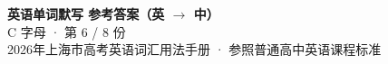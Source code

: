 \documentclass[10pt,a4paper]{article}
\begin{document}
\pagestyle{plain}

\begin{center}
{\LARGE\bfseries 英语单词默写 \quad 参考答案（英 $\to$ 中）}\\[0.22em]
{\large C 字母 · 第 6 / 8 份}\\[0.18em]
{\small 2026年上海市高考英语词汇用法手册 · 参照普通高中英语课程标准}
\end{center}

\vspace{0.2em}
\noindent{\color{rulegray}\rule{\textwidth}{0.8pt}}

\vspace{0.35em}

\vspace{0.25em}
\renewcommand{\arraystretch}{1.32}
\end{document}
